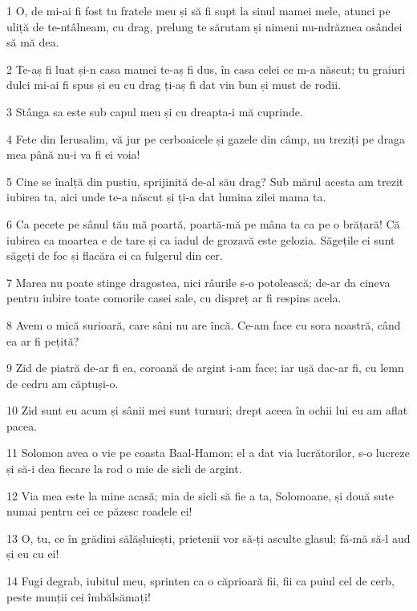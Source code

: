 \par 1 O, de mi-ai fi fost tu fratele meu și să fi supt la sinul mamei mele, atunci pe uliță de te-ntâlneam, cu drag, prelung te sărutam și nimeni nu-ndrăznea osândei să mă dea.
\par 2 Te-aș fi luat și-n casa mamei te-aș fi dus, în casa celei ce m-a născut; tu graiuri dulci mi-ai fi spus și eu cu drag ți-aș fi dat vin bun și must de rodii.
\par 3 Stânga sa este sub capul meu și cu dreapta-i mă cuprinde.
\par 4 Fete din Ierusalim, vă jur pe cerboaicele și gazele din câmp, nu treziți pe draga mea până nu-i va fi ei voia!
\par 5 Cine se înalță din pustiu, sprijinită de-al său drag? Sub mărul acesta am trezit iubirea ta, aici unde te-a născut și ți-a dat lumina zilei mama ta.
\par 6 Ca pecete pe sânul tău mă poartă, poartă-mă pe mâna ta ca pe o brățară! Că iubirea ca moartea e de tare și ca iadul de grozavă este gelozia. Săgețile ei sunt săgeți de foc și flacăra ei ca fulgerul din cer.
\par 7 Marea nu poate stinge dragostea, nici râurile s-o potolească; de-ar da cineva pentru iubire toate comorile casei sale, cu dispreț ar fi respins acela.
\par 8 Avem o mică surioară, care sâni nu are încă. Ce-am face cu sora noastră, când ea ar fi pețită?
\par 9 Zid de piatră de-ar fi ea, coroană de argint i-am face; iar ușă dac-ar fi, cu lemn de cedru am căptuși-o.
\par 10 Zid sunt eu acum și sânii mei sunt turnuri; drept aceea în ochii lui eu am aflat pacea.
\par 11 Solomon avea o vie pe coasta Baal-Hamon; el a dat via lucrătorilor, s-o lucreze și să-i dea fiecare la rod o mie de sicli de argint.
\par 12 Via mea este la mine acasă; mia de sicli să fie a ta, Solomoane, și două sute numai pentru cei ce păzesc roadele ei!
\par 13 O, tu, ce în grădini sălășluiești, prietenii vor să-ți asculte glasul; fă-mă să-l aud și eu cu ei!
\par 14 Fugi degrab, iubitul meu, sprinten ca o căprioară fii, fii ca puiul cel de cerb, peste munții cei îmbălsămați!


